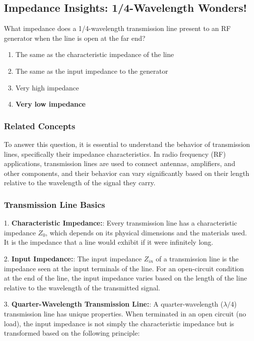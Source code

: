 \subsection{Impedance Insights: 1/4-Wavelength Wonders!}

\begin{tcolorbox}[colback=gray!10, colframe=black, title=E9F12] What impedance does a 1/4-wavelength transmission line present to an RF generator when the line is open at the far end?
\begin{enumerate}[label=\Alph*.]
    \item The same as the characteristic impedance of the line
    \item The same as the input impedance to the generator
    \item Very high impedance
    \item \textbf{Very low impedance}
\end{enumerate} \end{tcolorbox}

\subsubsection{Related Concepts}

To answer this question, it is essential to understand the behavior of transmission lines, specifically their impedance characteristics. In radio frequency (RF) applications, transmission lines are used to connect antennas, amplifiers, and other components, and their behavior can vary significantly based on their length relative to the wavelength of the signal they carry.

\subsubsection{Transmission Line Basics}

1. \textbf{Characteristic Impedance:}: Every transmission line has a characteristic impedance \(Z_0\), which depends on its physical dimensions and the materials used. It is the impedance that a line would exhibit if it were infinitely long.

2. \textbf{Input Impedance:}: The input impedance \(Z_{in}\) of a transmission line is the impedance seen at the input terminals of the line. For an open-circuit condition at the end of the line, the input impedance varies based on the length of the line relative to the wavelength of the transmitted signal.

3. \textbf{Quarter-Wavelength Transmission Line:}: A quarter-wavelength (\(\lambda/4\)) transmission line has unique properties. When terminated in an open circuit (no load), the input impedance is not simply the characteristic impedance but is transformed based on the following principle:

